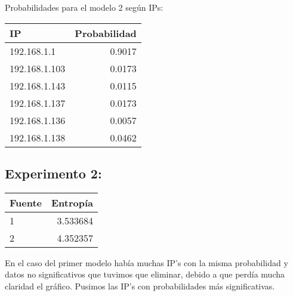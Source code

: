 Probabilidades para el modelo 2 según IPs:
\begin{center}
\begin{tabular}{ l r }
   IP &Probabilidad \\
\hline
192.168.1.1		& 0.9017 \\
192.168.1.103	& 0.0173 \\
192.168.1.143 	& 0.0115 \\
192.168.1.137	& 0.0173 \\
192.168.1.136	& 0.0057 \\
192.168.1.138	& 0.0462 \\
 \end{tabular}
\label{probabilidadesModel2}
\end{center}

% 
% 

\newpage
\subsection{Experimento 2:}

\begin{center}
\begin{tabular}{ l r }
   Fuente& Entropía  \\
\hline
   1 & 3.533684 \\
   2 & 4.352357 \\
 \end{tabular}
\label{entropiasexperimento2}
\end{center}

En el caso del primer modelo había muchas IP's con la misma probabilidad y datos no significativos que tuvimos que eliminar,
debido a que perdía mucha claridad el gráfico. Pusimos las IP's con probabilidades más significativas.

% 
% 
% 
% 

